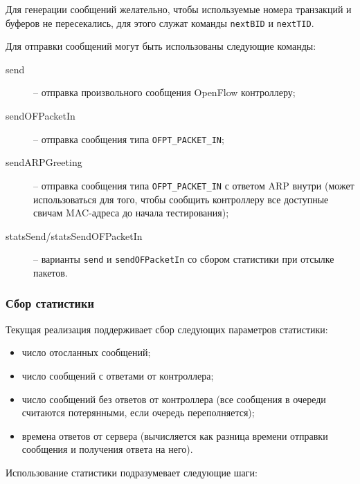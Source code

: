 \documentclass[9pt,a4paper]{article}
\begin{document}
Для генерации сообщений желательно, чтобы используемые номера транзакций и буферов 
не пересекались, для этого служат команды \lstinline!nextBID! и \lstinline!nextTID!.

Для отправки сообщений могут быть использованы следующие команды:

\begin{description}

  \item[send] -- отправка произвольного сообщения OpenFlow контроллеру;

  \item[sendOFPacketIn] -- отправка сообщения типа \lstinline!OFPT_PACKET_IN!;

  \item[sendARPGreeting] -- отправка сообщения типа \lstinline!OFPT_PACKET_IN!
    с ответом ARP внутри (может использоваться для того, чтобы сообщить контроллеру
    все доступные свичам MAC-адреса до начала тестирования);

  \item[statsSend/statsSendOFPacketIn] -- варианты \lstinline!send! и
    \lstinline!sendOFPacketIn! со сбором статистики при отсылке пакетов.

\end{description}

\subsubsection{Сбор статистики}

Текущая реализация поддерживает сбор следующих параметров статистики:

\begin{itemize}
  \item число отосланных сообщений;
  \item число сообщений с ответами от контроллера;
  \item число сообщений без ответов от контроллера (все сообщения в очереди считаются потерянными, если очередь переполняется);
  \item времена ответов от сервера (вычисляется как разница времени отправки сообщения
    и получения ответа на него).
\end{itemize}

Использование статистики подразумевает следующие шаги:
\end{document}
